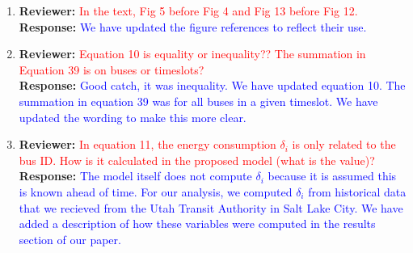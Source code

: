 \documentclass{article}
\newcommand\formatfeedback[2]
{%
	\textbf{Reviewer:} \textcolor{red}{#1} 
	\leavevmode\\[0.1in] \textbf{Response:} \textcolor{blue}{#2}
}
\begin{document}
\begin{enumerate}
{network data and the charging system infrastructure configuration must be included.}{This is great feedback, we have added an additional plot that illustrates how the number of constraints and variables  increase with the number of buses. The proposed work did not make any assumptions regarding the charging system infrastructure configuration, only that each charger is assumed to be on the same billing meter.}
	\item \formatfeedback{In the text, Fig 5 before Fig 4 and Fig 13 before Fig 12.}{We have updated the figure references to reflect their use.}
	\item \formatfeedback{Equation 10 is equality or inequality?? The summation in Equation 39 is on buses or timeslots?}{Good catch, it was inequality.  We have updated equation 10. The summation in equation 39 was for all buses in a given timeslot. We have updated the wording to make this more clear.}
	\item \formatfeedback{In equation 11, the energy consumption $\delta_i$ is only related to the bus ID. How is it calculated in
the proposed model (what is the value)?}{The model itself does not compute $\delta_i$ because it is assumed this is known ahead of time. For our analysis, we computed $\delta_i$ from historical data that we recieved from the Utah Transit Authority in Salt Lake City. We have added a description of how these variables were computed in the results section of our paper.}
\end{enumerate}
\end{document}
